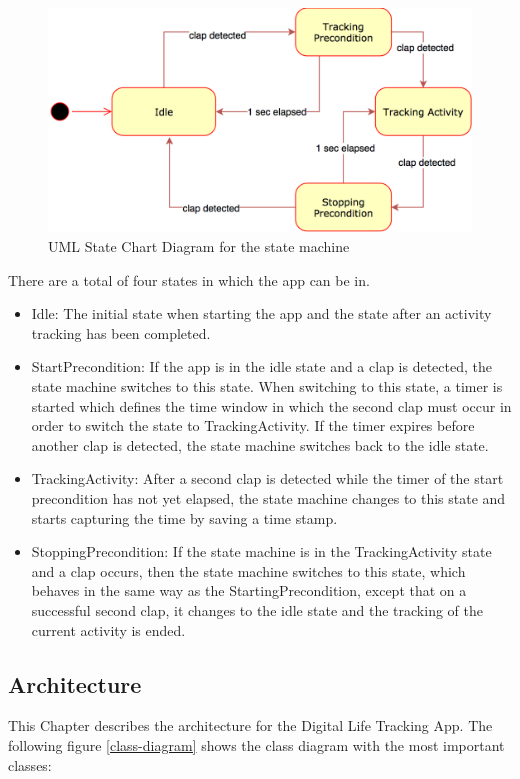 \begin{figure}[H]
	\centering
	\includegraphics[width=1.0\linewidth]{./imgs/statemachine.png}
	\caption[Caption for LOF]{UML State Chart Diagram for the state machine}
	\label{statemachine}
\end{figure}

There are a total of four states in which the app can be in. 
\begin{itemize}
\item Idle: The initial state when starting the app and the state after an activity tracking has been completed.
\item StartPrecondition: If the app is in the idle state and a clap is detected, the state machine switches to this state. When switching to this state, a timer is started which defines the time window in which the second clap must occur in order to switch the state to TrackingActivity. If the timer expires before another clap is detected, the state machine switches back to the idle state.
\item TrackingActivity: After a second clap is detected while the timer of the start precondition has not yet elapsed, the state machine changes to this state and starts capturing the time by saving a time stamp.
\item StoppingPrecondition: If the state machine is in the TrackingActivity state and a clap occurs, then the state machine switches to this state, which behaves in the same way as the StartingPrecondition, except that on a successful second clap, it changes to the idle state and the tracking of the current activity is ended.
\end{itemize}

\subsection{Architecture}
\label{sec:org393d659}
This Chapter describes the architecture for the Digital Life Tracking App. The following figure \ref{class-diagram} shows the class diagram with the most important classes:

